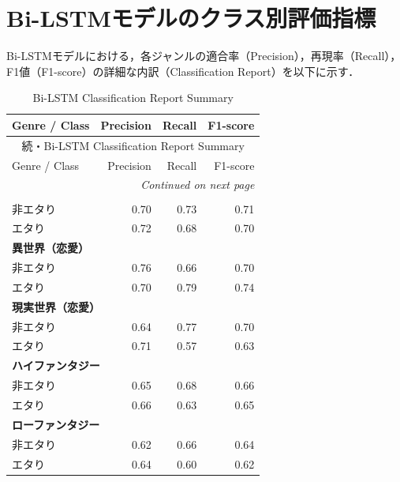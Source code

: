 \documentclass[uplatex, dvipdfmx, 11pt, a4paper, report]{jsbook}
\begin{document}

\chapter{Bi-LSTMモデルのクラス別評価指標}
\label{app:bilstm_detail}

Bi-LSTMモデルにおける，各ジャンルの適合率（Precision），再現率（Recall），F1値（F1-score）の詳細な内訳（Classification Report）を以下に示す．

\begin{longtable}{lrrr}
\caption{Bi-LSTM Classification Report Summary} \\
\hline
Genre / Class & Precision & Recall & F1-score \\ \hline
\endfirsthead

\multicolumn{4}{c}{{続・Bi-LSTM Classification Report Summary}} \\
\hline
Genre / Class & Precision & Recall & F1-score \\ \hline
\endhead

\hline \multicolumn{4}{r}{\textit{Continued on next page}} \\
\endfoot

\hline
\endlastfoot

\multicolumn{4}{l}{\textbf{全データ (All)}} \\
\quad 非エタり & 0.70 & 0.73 & 0.71 \\
\quad エタり & 0.72 & 0.68 & 0.70 \\ \hline

\multicolumn{4}{l}{\textbf{異世界（恋愛）}} \\
\quad 非エタり & 0.76 & 0.66 & 0.70 \\
\quad エタり & 0.70 & 0.79 & 0.74 \\ \hline

\multicolumn{4}{l}{\textbf{現実世界（恋愛）}} \\
\quad 非エタり & 0.64 & 0.77 & 0.70 \\
\quad エタり & 0.71 & 0.57 & 0.63 \\ \hline

\multicolumn{4}{l}{\textbf{ハイファンタジー}} \\
\quad 非エタり & 0.65 & 0.68 & 0.66 \\
\quad エタり & 0.66 & 0.63 & 0.65 \\ \hline

\multicolumn{4}{l}{\textbf{ローファンタジー}} \\
\quad 非エタり & 0.62 & 0.66 & 0.64 \\
\quad エタり & 0.64 & 0.60 & 0.62 \\ \hline


\end{longtable}
\end{document}
